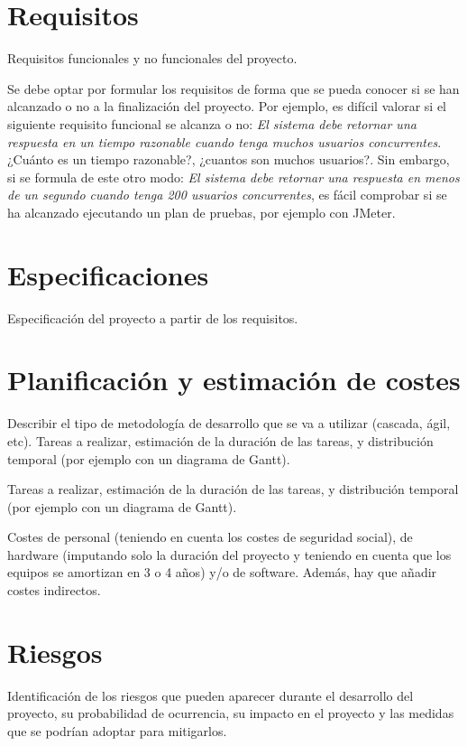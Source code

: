 
\section{Requisitos}
Requisitos funcionales y no funcionales del proyecto.

Se debe optar por formular los requisitos de forma que se pueda
conocer si se han alcanzado o no a la finalización del proyecto. Por
ejemplo, es difícil valorar si el siguiente requisito funcional se
alcanza o no: \textit{El sistema debe retornar una respuesta en un tiempo
razonable cuando tenga muchos usuarios concurrentes}. ¿Cuánto es un
tiempo razonable?, ¿cuantos son muchos usuarios?. Sin embargo, si se
formula de este otro modo: \textit{El sistema debe retornar una
respuesta en menos de un segundo cuando tenga 200 usuarios
concurrentes}, es fácil comprobar si se ha alcanzado ejecutando un
plan de pruebas, por ejemplo con JMeter.

\section{Especificaciones}
Especificación del proyecto a partir de los requisitos.

\section{Planificación y estimación de costes}
Describir el tipo de metodología de desarrollo que se va a utilizar
(cascada, ágil, etc).
Tareas a realizar, estimación de la duración de las tareas, y
distribución temporal (por ejemplo con un diagrama de Gantt).

Tareas a realizar, estimación de la duración de las tareas, y
distribución temporal (por ejemplo con un diagrama de Gantt).

Costes de personal (teniendo en cuenta los costes de seguridad
social), de hardware (imputando solo la duración del proyecto y teniendo
en cuenta que los equipos se amortizan en 3 o 4 años) y/o de software.
Además, hay que añadir costes indirectos.

\section{Riesgos}

Identificación de los riesgos que pueden aparecer durante el
desarrollo del proyecto, su probabilidad de ocurrencia, su impacto en
el proyecto y las medidas que se podrían adoptar para mitigarlos.

